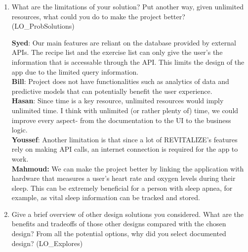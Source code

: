 \documentclass[12pt, titlepage]{article}
\begin{document}
\begin{enumerate}
	\item What are the limitations of your solution?  Put another way, given
	unlimited resources, what could you do to make the project better? (LO\_ProbSolutions)
	
	\textbf{Syed}: Our main features are reliant on the database provided by external APIs. The recipe list and the exercise list can only give the user's the information that is accessable through the API. This limits the design of the app due to the limited query information. \\
	\textbf{Bill}: Project does not have functionalities such as analytics of data and predictive models that can potentially benefit the user experience. \\
	\textbf{Hasan}: Since time is a key resource, unlimited resources would imply unlimited time. I think with unlimited (or rather plenty of) time, we could improve every aspect- from the documentation to the UI to the business logic. \\
	\textbf{Youssef}: Another limitation is that since a lot of REVITALIZE's features rely on making API calls, an internet connection is required for the app to work. \\
	\textbf{Mahmoud:} We can make the project better by linking the application with hardware that measures a user's heart rate and oxygen levels during their sleep. This can be extremely beneficial for a person with sleep apnea, for example, as vital sleep information can be tracked and stored.
	
	
	
	\item Give a brief overview of other design solutions you considered.  What
	are the benefits and tradeoffs of those other designs compared with the chosen
	design?  From all the potential options, why did you select documented design?
	(LO\_Explores)
	

\end{enumerate}
\end{document}
